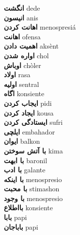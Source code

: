 \textbf{ انگشت  } dede \\
\textbf{ انیسون  } anis \\
\textbf{ اهانت کردن  } menospresiá \\
\textbf{ اهانت  } ofensa \\
\textbf{ اهمیت دادن  } aksènt \\
\textbf{ اواره شدن  } chol \\
\textbf{ اوباش  } chòler \\
\textbf{ اولاد  } rasa \\
\textbf{ اولیه  } sentral \\
\textbf{ اگاه  } konsiente \\
\textbf{ ایجاب کردن  } pidi \\
\textbf{ ایجاد کردن  } kousa \\
\textbf{ ایستادگی کردن  } sufri \\
\textbf{ ایلچی  } embahador \\
\textbf{ ایوان  } balkon \\
\textbf{ با آتش سوختن  } kima \\
\textbf{ با ابهت  } baronil \\
\textbf{ با ادب  } galante \\
\textbf{ با اینکه  } menospresio \\
\textbf{ با محبت  } stimashon \\
\textbf{ با وجود  } menospresio \\
\textbf{ بااطلاع  } konsiente \\
\textbf{ بابا  } papi \\
\textbf{ باباجان  } papi \\
